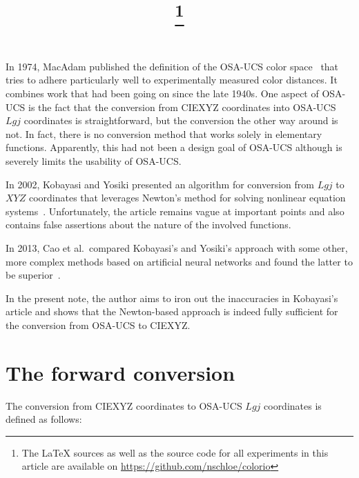 \documentclass{scrartcl}
\title{\mytitle\footnote{The LaTeX sources as well as the source code for all
experiments in this article are available on \url{https://github.com/nschloe/colorio}}}
\author{\myauthor}
\theoremstyle{named}
\begin{document}
\maketitle

In 1974, MacAdam published the definition of the OSA-UCS color space~\cite{macadam} that
tries to adhere particularly well to experimentally measured color distances. It
combines work that had been going on since the late 1940s.  One aspect of OSA-UCS is
the fact that the conversion from CIEXYZ coordinates into OSA-UCS $Lgj$ coordinates is
straightforward, but the conversion the other way around is not. In fact, there is no
conversion method that works solely in elementary functions. Apparently, this had not
been a design goal of OSA-UCS although is severely limits the usability of OSA-UCS.

In 2002, Kobayasi and Yosiki presented an algorithm for conversion from $Lgj$ to $XYZ$
coordinates  that leverages Newton's method for solving nonlinear equation
systems~\cite{kobayasi}. Unfortunately, the article remains vague at important points
and also contains false assertions about the nature of the involved functions.

In 2013, Cao et al.\ compared Kobayasi's and Yosiki's approach with some other, more
complex methods based on artificial neural networks and found the latter to be
superior~\cite{cao}.

In the present note, the author aims to iron out the inaccuracies in Kobayasi's article
and shows that the Newton-based approach is indeed fully sufficient for the conversion
from OSA-UCS to CIEXYZ.

\section{The forward conversion}

The conversion from CIEXYZ coordinates to OSA-UCS $Lgj$ coordinates is defined as
follows:
\end{document}
